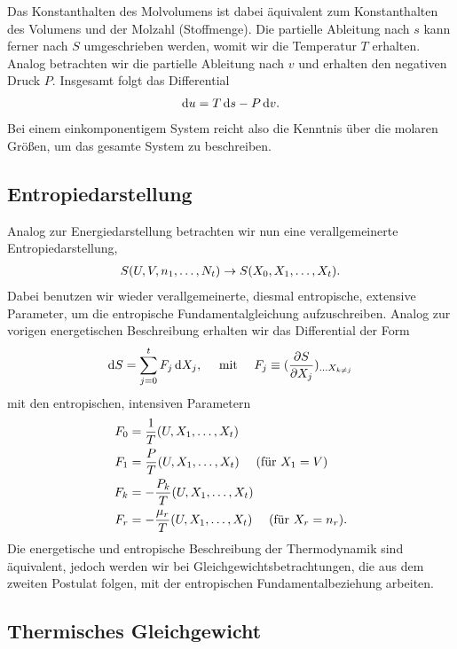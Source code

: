 Das Konstanthalten des Molvolumens ist dabei äquivalent zum Konstanthalten des Volumens und der Molzahl (Stoffmenge). Die partielle Ableitung nach $s$ kann ferner nach $S$ umgeschrieben werden, womit wir die Temperatur $T$ erhalten.
Analog betrachten wir die partielle Ableitung nach $v$ und erhalten den negativen Druck $P$.
Insgesamt folgt das Differential
\begin{align*}
    \mathop{}\!\mathrm{d} u = T\mathop{}\!\mathrm{d} s -P\mathop{}\!\mathrm{d} v.
\end{align*}
Bei einem einkomponentigem System reicht also die Kenntnis über die molaren Größen, um das gesamte System zu beschreiben.

\subsection{Entropiedarstellung}
Analog zur Energiedarstellung betrachten wir nun eine verallgemeinerte Entropiedarstellung,
\begin{align*}
    S(U,V,n_1,\ldots,N_t) \rightarrow S(X_0,X_1,\ldots,X_t).
\end{align*}
Dabei benutzen wir wieder verallgemeinerte, diesmal entropische, extensive Parameter, um die entropische Fundamentalgleichung aufzuschreiben. Analog zur vorigen energetischen Beschreibung erhalten wir das Differential der Form
\begin{align*}
    \mathop{}\!\mathrm{d} S = \sum_{j=0}^tF_j\mathop{}\!\mathrm{d} X_j ,\quad\text{ mit } \quad F_j\equiv(\frac{\partial S}{\partial X_j})_{\ldots X_{k\neq j}}
\end{align*}
mit den entropischen, intensiven Parametern
\begin{align*}
    F_0 & =\frac{1}{T}(U,X_1,\ldots,X_t)                                    \\
    F_1 & =\frac{P}{T}(U,X_1,\ldots,X_t) \quad\text{ (für $X_1=V$)}         \\
    F_k & =-\frac{P_k}{T}(U,X_1,\ldots,X_t)                                 \\
    F_r & =-\frac{\mu_r}{T}(U,X_1,\ldots,X_t) \quad\text{ (für $X_r=n_r$)}.
\end{align*}
Die energetische und entropische Beschreibung der Thermodynamik sind äquivalent, jedoch werden wir bei Gleichgewichtsbetrachtungen, die aus dem zweiten Postulat folgen, mit der entropischen Fundamentalbeziehung arbeiten.

\subsection{Thermisches Gleichgewicht\label{sec:thermisches_gleichgewicht}}

